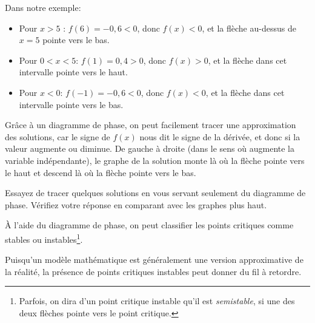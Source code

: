 Dans notre exemple:
\begin{itemize}
	\item Pour $x > 5$ : $f(6) = -0{,}6 < 0$, donc $f(x) < 0$, et la flèche au-dessus de $x=5$ pointe vers le bas.
	\item Pour $0 < x < 5$: $f(1) = 0{,}4 > 0$, donc $f(x) > 0$, et la flèche dans cet intervalle pointe vers le haut.
	\item Pour $x <0$: $f(-1) = -0{,}6 < 0$, donc $f(x) < 0$, et la flèche dans cet intervalle pointe vers le bas.
\end{itemize}

\begin{center}
\end{center}

\pagebreak[0]
Grâce à un diagramme de phase, on peut facilement tracer une approximation des solutions, car le signe de $f(x)$ nous dit le signe de la dérivée, et donc si la valeur augmente ou diminue.
De gauche à droite (dans le sens où augmente la variable indépendante),
le graphe de la solution monte là où la flèche pointe vers le haut et descend là où la flèche pointe vers le bas.

\begin{exercise}
Essayez de tracer quelques solutions en vous servant seulement du diagramme de phase.
Vérifiez votre réponse en comparant avec les graphes plus haut.
\end{exercise}

\pagebreak[0]
À l'aide du diagramme de phase, on peut classifier les points critiques comme stables ou instables\footnote{Parfois, on dira d'un point critique instable qu'il est \emph{semistable}, si une des deux flèches pointe vers le point critique.}.

\begin{center}
\end{center}

Puisqu'un modèle mathématique est généralement une version approximative de la réalité,
la présence de points critiques instables peut donner du fil à retordre.

